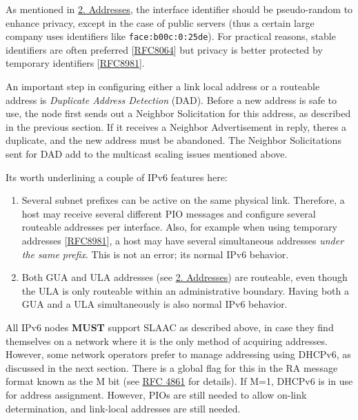 \documentclass[
]{article}
\begin{document}
As mentioned in \hyperref[addresses]{2. Addresses}, the interface
identifier should be pseudo-random to enhance privacy, except in the
case of public servers (thus a certain large company uses identifiers
like \texttt{face:b00c:0:25de}). For practical reasons, stable
identifiers are often preferred
{[}\href{https://www.rfc-editor.org/info/rfc8064}{RFC8064}{]} but
privacy is better protected by temporary identifiers
{[}\href{https://www.rfc-editor.org/info/rfc8981}{RFC8981}{]}.

An important step in configuring either a link local address or a
routeable address is \emph{Duplicate Address Detection} (DAD). Before a
new address is safe to use, the node first sends out a Neighbor
Solicitation for this address, as described in the previous section. If
it receives a Neighbor Advertisement in reply, there\textquotesingle s a
duplicate, and the new address must be abandoned. The Neighbor
Solicitations sent for DAD add to the multicast scaling issues mentioned
above.

It\textquotesingle s worth underlining a couple of IPv6 features here:

\begin{enumerate}
\def\labelenumi{\arabic{enumi}.}
\item
  Several subnet prefixes can be active on the same physical link.
  Therefore, a host may receive several different PIO messages and
  configure several routeable addresses per interface. Also, for example
  when using temporary addresses
  {[}\href{https://www.rfc-editor.org/info/rfc8981}{RFC8981}{]}, a host
  may have several simultaneous addresses \emph{under the same prefix}.
  This is not an error; it\textquotesingle s normal IPv6 behavior.
\item
  Both GUA and ULA addresses (see \hyperref[addresses]{2. Addresses})
  are routeable, even though the ULA is only routeable within an
  administrative boundary. Having both a GUA and a ULA simultaneously is
  also normal IPv6 behavior.
\end{enumerate}

All IPv6 nodes \textbf{MUST} support SLAAC as described above, in case
they find themselves on a network where it is the only method of
acquiring addresses. However, some network operators prefer to manage
addressing using DHCPv6, as discussed in the next section. There is a
global flag for this in the RA message format known as the M bit (see
\href{https://www.rfc-editor.org/info/rfc4861}{RFC 4861} for details).
If M=1, DHCPv6 is in use for address assignment. However, PIOs are still
needed to allow on-link determination, and link-local addresses are
still needed.
\end{document}
